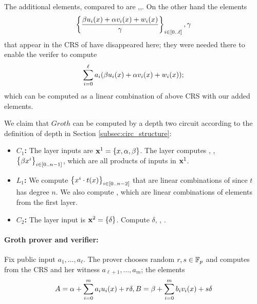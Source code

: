 \documentclass{article}
\begin{document}
% 

The additional elements, compared to \cite{Groth16} are ,,.
On the other hand the elements 
\[\left\{\frac{\beta u_i(x)+ \alpha v_i(x) + w_i(x)}{\gamma}\right\}_{i\in [0..\ell]},\gamma\]
that appear in the CRS of \cite{Groth16} have disappeared here; they were needed there to enable the verifer to 
compute 
\[\sum_{i=0}^\ell a_i( \beta u_i(x)+\alpha v_i(x) +w_i(x));\]
which can be computed as a linear combination of above CRS with our added elements.

We claim that $Groth$ can be computed by a depth two circuit according to the definition of depth in Section \ref{subsec:circ_structure}:
\begin{itemize}
\item \textbf{$C_1$:} The layer inputs  are $\mathbf{x}^1=\left\{x,\alpha,\beta\right\}$. The layer computes  , , $\left\{\beta x^i\right\}_{i\in[0..n-1]}$, which  are all products of inputs in $\mathbf{x}^1$.
\item
\textbf{$L_1$:} We compute $\left\{x^i\cdot t(x)\right\}_{i\in[0..n-2]}$ that are linear combinations of  since $t$ has degree $n$.
We also compute , which are linear combinations of elements from the first layer.
\item
\textbf{$C_2$:} The layer input is $\mathbf{x}^2 = \left\{\delta\right\}$.
Compute $\delta$,
,
.

\end{itemize}
\paragraph{Groth prover and verifier:}
Fix public input $a_1,\ldots,a_\ell$.
The prover chooses random $r,s\in {\mathbb F}_p$ and computes from the CRS and her witness $a_{\ell+1},\ldots,a_m$; the elements 
\[A=\alpha + \sum_{i=0}^m a_iu_i(x) +r\delta,  B=\beta +\sum_{i=0}^m b_iv_i(x) + s\delta\]
\end{document}
